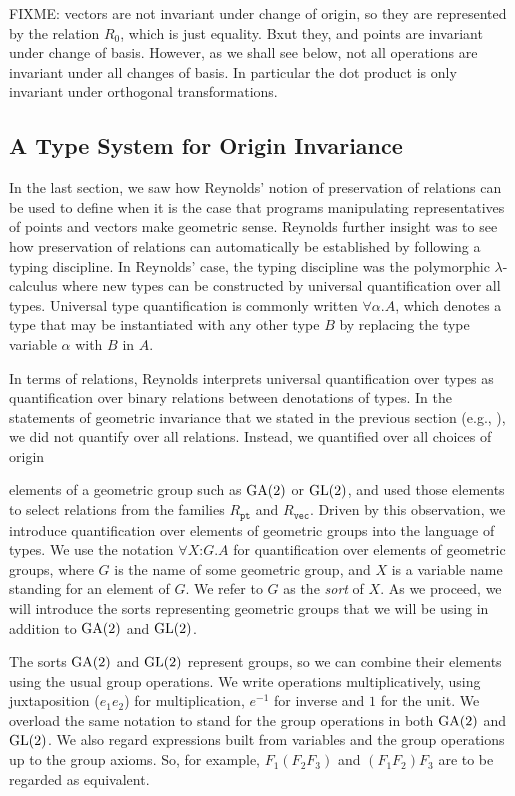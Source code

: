 FIXME: vectors are not invariant under change of origin, so they are
represented by the relation $R_0$, which is just equality. Bxut they,
and points are invariant under change of basis. However, as we shall
see below, not all operations are invariant under all changes of
basis. In particular the dot product is only invariant under
orthogonal transformations.

\subsection{A Type System for Origin Invariance}
\label{sec:type-system-geom-intro}

In the last section, we saw how Reynolds' notion of preservation of
relations can be used to define when it is the case that programs
manipulating representatives of points and vectors make geometric
sense. Reynolds further insight was to see how preservation of
relations can automatically be established by following a typing
discipline. In Reynolds' case, the typing discipline was the
polymorphic $\lambda$-calculus where new types can be constructed by
universal quantification over all types. Universal type quantification
is commonly written $\forall \alpha. A$, which denotes a type that may
be instantiated with any other type $B$ by replacing the type variable
$\alpha$ with $B$ in $A$.

In terms of relations, Reynolds interprets universal quantification
over types as quantification over binary relations between denotations
of types. In the statements of geometric invariance that we stated in
the previous section (e.g., ), we
did not quantify over all relations. Instead, we quantified over all choices of origin 


elements of a geometric group such as $\mathrm{GA}(2)$ or $\mathrm{GL}(2)$, and used
those elements to select relations from the families $R_{\texttt{pt}}$
and $R_{\texttt{vec}}$. Driven by this observation, we introduce
quantification over elements of geometric groups into the language of
types. We use the notation $\forall X \mathord: G. A$ for
quantification over elements of geometric groups, where $G$ is the
name of some geometric group, and $X$ is a variable name standing for
an element of $G$. We refer to $G$ as the \emph{sort} of $X$. As we
proceed, we will introduce the sorts representing geometric groups
that we will be using in addition to $\mathrm{GA}(2)$ and $\mathrm{GL}(2)$.

The sorts $\mathrm{GA}(2)$ and $\mathrm{GL}(2)$ represent groups, so we can combine
their elements using the usual group operations. We write operations
multiplicatively, using juxtaposition ($e_1e_2$) for multiplication,
$e^{-1}$ for inverse and $1$ for the unit. We overload the same
notation to stand for the group operations in both $\mathrm{GA}(2)$ and
$\mathrm{GL}(2)$. We also regard expressions built from variables and the
group operations up to the group axioms. So, for example,
$F_1(F_2F_3)$ and $(F_1F_2)F_3$ are to be regarded as equivalent.

